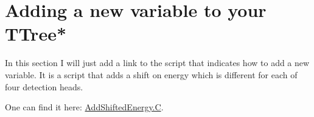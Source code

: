 \documentclass[12pt]{article}
\begin{document}
\section{Adding a new variable to your TTree*}
In this section I will just add a link to the script that indicates how to add a new variable. It is a script that adds a shift on energy which is different for each of four detection heads. 

One can find it here:   \href{https://github.com/kochebina/ROOT_manual_for_Gate_users/blob/master/Materials/AddShiftedEnergy.C}{AddShiftedEnergy.C}. 






%
%
\end{document}
